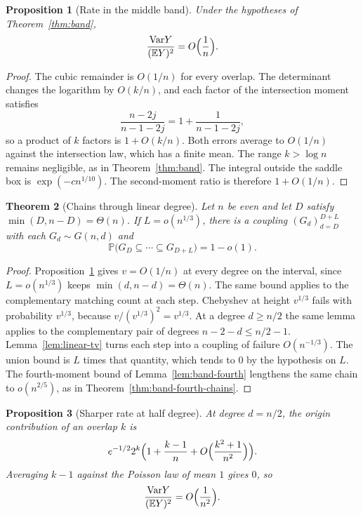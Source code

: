 \documentclass[11pt]{article}
\newtheorem{theorem}{Theorem}
\newtheorem{proposition}[theorem]{Proposition}
\newcommand{\EE}{\mathbb{E}}
\newcommand{\PP}{\mathbb{P}}
\newcommand{\Var}{\mathrm{Var}}
\begin{document}
\begin{proposition}[Rate in the middle band]
\label{prop:band-rate}
Under the hypotheses of Theorem~\ref{thm:band},
\[
\frac{\Var Y}{(\EE Y)^2}=O\Bigl(\frac1n\Bigr).
\]
\end{proposition}

\begin{proof}
The cubic remainder is \(O(1/n)\) for every overlap.
The determinant changes the logarithm by \(O(k/n)\), and each factor of the intersection moment satisfies
\[
\frac{n-2j}{n-1-2j}=1+\frac1{n-1-2j},
\]
so a product of \(k\) factors is \(1+O(k/n)\).
Both errors average to \(O(1/n)\) against the intersection law, which has a finite mean.
The range \(k>\log n\) remains negligible, as in Theorem~\ref{thm:band}.
The integral outside the saddle box is \(\exp(-c n^{1/10})\).
The second-moment ratio is therefore \(1+O(1/n)\).
\end{proof}

\begin{theorem}[Chains through linear degree]
\label{thm:band-chains}
Let \(n\) be even and let \(D\) satisfy \(\min(D,n-D)=\Theta(n)\).
If \(L=o(n^{1/3})\), there is a coupling \((G_d)_{d=D}^{D+L}\) with each \(G_d\sim G(n,d)\) and
\[
\PP\bigl(G_D\subseteq\cdots\subseteq G_{D+L}\bigr)=1-o(1).
\]
\end{theorem}

\begin{proof}
Proposition~\ref{prop:band-rate} gives \(v=O(1/n)\) at every degree on the interval, since \(L=o(n^{1/3})\) keeps \(\min(d,n-d)=\Theta(n)\).
The same bound applies to the complementary matching count at each step.
Chebyshev at height \(v^{1/3}\) fails with probability \(v^{1/3}\), because \(v/(v^{1/3})^2=v^{1/3}\).
At a degree \(d\ge n/2\) the same lemma applies to the complementary pair of degrees \(n-2-d\le n/2-1\).
Lemma~\ref{lem:linear-tv} turns each step into a coupling of failure \(O(n^{-1/3})\).
The union bound is \(L\) times that quantity, which tends to \(0\) by the hypothesis on \(L\).
The fourth-moment bound of Lemma~\ref{lem:band-fourth} lengthens the same chain to \(o(n^{2/5})\), as in Theorem~\ref{thm:band-fourth-chains}.
\end{proof}

\begin{proposition}[Sharper rate at half degree]
\label{prop:half-rate}
At degree \(d=n/2\), the origin contribution of an overlap \(k\) is
\[
e^{-1/2}2^{k}\Bigl(1+\frac{k-1}{n}+O\Bigl(\frac{k^2+1}{n^2}\Bigr)\Bigr).
\]
Averaging \(k-1\) against the Poisson law of mean \(1\) gives \(0\), so
\[
\frac{\Var Y}{(\EE Y)^2}=O\Bigl(\frac1{n^2}\Bigr).
\]
\end{proposition}
\end{document}
